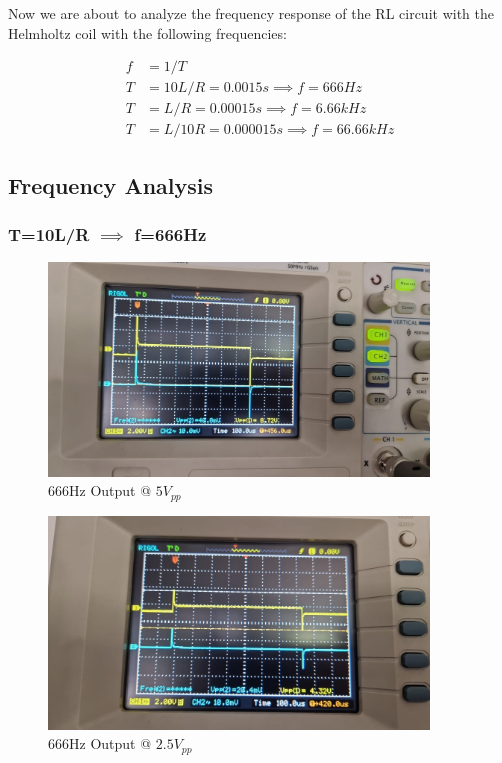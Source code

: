 Now we are about to analyze the frequency response of the RL circuit with the Helmholtz coil with the following frequencies:

\begin{align*}
    f &= 1/T \\
    T &= 10L/R = 0.0015s \implies f = 666Hz \\
    T &= L/R = 0.00015s \implies f = 6.66kHz \\
    T &= L/10R = 0.000015s \implies f = 66.66kHz
\end{align*}

\newpage{}
\thispagestyle{plain}

\subsection{Frequency Analysis}

\subsubsection{T=10L/R $\implies$ f=666Hz}

\begin{figure}[h]
    \centering
    \includegraphics[width=0.9\textwidth]{assets/666-hz-5vpp.jpg}
    \caption{666Hz Output @ $5V_{pp}$}
    \label{fig:666-hz-5vpp-output}
\end{figure}

\begin{figure}[h]
    \centering
    \includegraphics[width=0.9\textwidth]{assets/666-hz-2.5vpp.jpg}
    \caption{666Hz Output @ $2.5V_{pp}$}
    \label{fig:666-hz-2.5vpp-output}
\end{figure}

